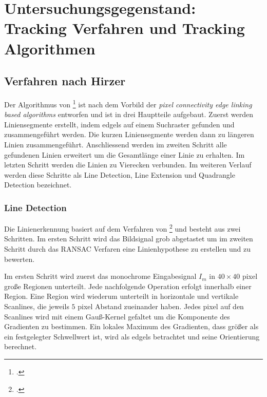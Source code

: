 \section{Untersuchungsgegenstand: Tracking Verfahren und Tracking Algorithmen} %
\label{sec:untersuchungsgegenstand}
\begin{comment}
	Untersuchungsgegenstand: Verfahren und Algorithmen präzise vorstellen und ihre Unterschiede hervorheben.
	Notwendige Kriterien der Algorithmen bestimmen

	Grober Ablauf der Verfahren:
	* Wer hats erfunden?
	* Wie ist das Verfahren aufgebaut (Algo in grob)
	* Welche Kriterien müssen erfüllt sein (monochrome, rgb eingabe)?
\end{comment}

\subsection{Verfahren nach Hirzer} %
\label{sub:verfahren_nach_hirzer}

Der Algorithmus von \citeauthor{hirzer08}\footcite{hirzer08} ist nach dem Vorbild der \textit{pixel connectivity edge
 linking based algorithms} entworfen und ist in drei Hauptteile aufgebaut. Zuerst werden Liniensegmente erstellt,
 indem \gls{edgels} auf einem Suchraster gefunden und zusammengeführt werden. Die kurzen Liniensegmente werden dann zu
 längeren Linien zusammengeführt. Anschliessend werden im zweiten Schritt alle gefundenen Linien erweitert um die
 Gesamtlänge einer Linie zu erhalten. Im letzten Schritt werden die Linien zu Vierecken verbunden. Im weiteren Verlauf
 werden diese Schritte als Line Detection, Line Extension und Quadrangle Detection bezeichnet.

\subsubsection{Line Detection} %
\label{sub:line_detection}
Die Linienerkennung basiert auf dem Verfahren von \citeauthor{clarke96}\footcite{clarke96} und besteht aus zwei Schritten. Im ersten Schritt wird das Bildsignal grob abgetastet um im zweiten Schritt durch das RANSAC Verfaren eine Linienhypothese zu erstellen und zu bewerten.

Im ersten Schritt wird zuerst das monochrome Eingabesignal $I_m$ in $40 \times 40$ \gls{pixel} große Regionen
 unterteilt. Jede nachfolgende Operation erfolgt innerhalb einer Region. Eine Region wird wiederum unterteilt in
 horizontale und vertikale Scanlines, die jeweils $5$ \gls{pixel} Abstand zueinander haben. Jedes \gls{pixel} auf den
 Scanlines wird mit einem Gauß-Kernel gefaltet um die Komponente des Gradienten zu bestimmen. Ein lokales Maximum des
 Gradienten, dass größer als ein festgelegter Schwellwert ist, wird als \gls{edgels} betrachtet und seine Orientierung
 berechnet.

